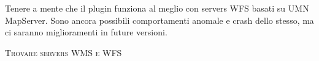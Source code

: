 Tenere a mente che il plugin funziona al meglio con servers WFS basati su UMN
MapServer. Sono ancora possibili comportamenti anomale e crash dello stesso,
ma ci saranno miglioramenti in future versioni.

\begin{Tip}[ht]\caption{\textsc{Trovare servers WMS e WFS}}
\end{Tip} 

